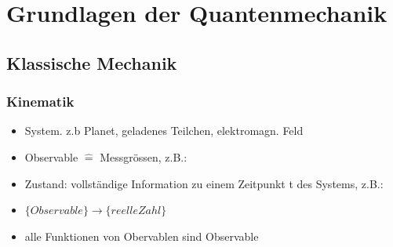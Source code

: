 
%
	\chapter{Grundlagen der Quantenmechanik}
		\section{Klassische Mechanik}
			\subsection{Kinematik}

				\begin{itemize}
					\item System. z.b Planet, geladenes Teilchen, elektromagn. Feld
					\item Observable $\hat{=}$ Messgrössen,	z.B.:
					
                           
					\item Zustand: vollständige Information zu einem Zeitpunkt t des Systems, z.B.: 
					 \item $\{ Observable\} \rightarrow \{reelle Zahl\}$
					 \item alle Funktionen von Obervablen sind Observable             
				\end{itemize}

